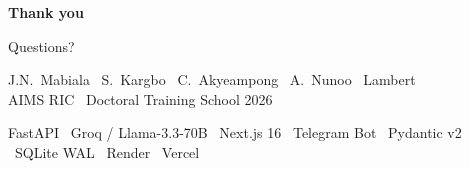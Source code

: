 \documentclass[aspectratio=169, 10pt]{beamer}
\begin{document}
\begin{frame}[plain]
  \begin{center}
    \vfill
    {\Huge\bfseries\color{aims-blue}Thank you}\par
    \vspace{0.4em}
    {\large\color{aims-teal}Questions?}\par
    \vspace{0.7em}
    \par
    \vspace{0.7em}
    {\small\color{black!55}
      J.N.\ Mabiala \textbullet\ S.\ Kargbo \textbullet\ C.\ Akyeampong
      \textbullet\ A.\ Nunoo \textbullet\ Lambert\\[0.3em]
      AIMS RIC \textbullet\ Doctoral Training School 2026%
    }\par
    \vspace{0.5em}
    {\footnotesize\color{aims-blue!65}
      FastAPI \textbullet\ Groq / Llama-3.3-70B \textbullet\ Next.js 16
      \textbullet\ Telegram Bot \textbullet\ Pydantic v2 \textbullet\ SQLite WAL
      \textbullet\ Render \textbullet\ Vercel%
    }
    \vfill
  \end{center}
\end{frame}
\end{document}
